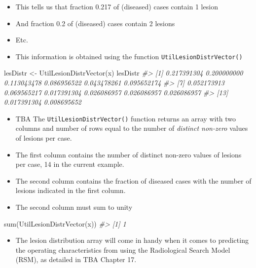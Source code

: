 \documentclass[
]{book}
\newenvironment{Shaded}{\begin{snugshade}}{\end{snugshade}}
\newcommand{\CommentTok}[1]{\textcolor[rgb]{0.56,0.35,0.01}{\textit{#1}}}
\newcommand{\FunctionTok}[1]{\textcolor[rgb]{0.00,0.00,0.00}{#1}}
\newcommand{\NormalTok}[1]{#1}
\newcommand{\OtherTok}[1]{\textcolor[rgb]{0.56,0.35,0.01}{#1}}
\providecommand{\tightlist}{%
  \setlength{\itemsep}{0pt}\setlength{\parskip}{0pt}}
\begin{document}
\begin{itemize}
\tightlist
\item
  This tells us that fraction 0.217 of (diseased) cases contain 1 lesion
\item
  And fraction 0.2 of (diseased) cases contain 2 lesions
\item
  Etc.
\item
  This information is obtained using the function \texttt{UtilLesionDistrVector()}
\end{itemize}

\begin{Shaded}
\begin{Highlighting}[]
\NormalTok{lesDistr }\OtherTok{\textless{}{-}} \FunctionTok{UtilLesionDistrVector}\NormalTok{(x)}
\NormalTok{lesDistr}
\CommentTok{\#\textgreater{}  [1] 0.217391304 0.200000000 0.113043478 0.086956522 0.043478261 0.095652174}
\CommentTok{\#\textgreater{}  [7] 0.052173913 0.069565217 0.017391304 0.026086957 0.026086957 0.026086957}
\CommentTok{\#\textgreater{} [13] 0.017391304 0.008695652}
\end{Highlighting}
\end{Shaded}

\begin{itemize}
\tightlist
\item
  TBA The \texttt{UtilLesionDistrVector()} function returns an array with two columns and number of rows equal to the number of \emph{distinct non-zero} values of lesions per case.
\item
  The first column contains the number of distinct non-zero values of lesions per case, 14 in the current example.
\item
  The second column contains the fraction of diseased cases with the number of lesions indicated in the first column.
\item
  The second column must sum to unity
\end{itemize}

\begin{Shaded}
\begin{Highlighting}[]
\FunctionTok{sum}\NormalTok{(}\FunctionTok{UtilLesionDistrVector}\NormalTok{(x))}
\CommentTok{\#\textgreater{} [1] 1}
\end{Highlighting}
\end{Shaded}

\begin{itemize}
\tightlist
\item
  The lesion distribution array will come in handy when it comes to predicting the operating characteristics from using the Radiological Search Model (RSM), as detailed in TBA Chapter 17.
\end{itemize}
\end{document}
